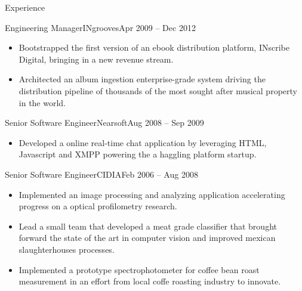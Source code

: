 \documentclass[calibri]{mcdowellcv}
\begin{document}
\begin{cvsection}{Experience}
\begin{cvsubsection}{Engineering Manager}{INgrooves}{Apr 2009 -- Dec 2012}
\begin{itemize}
    \item Bootstrapped the first version of an ebook distribution platform, INscribe Digital, bringing in a new revenue stream.
    \item Architected an album ingestion enterprise-grade system driving the distribution pipeline of thousands of the most sought after musical property in the world.
		\end{itemize}
	\end{cvsubsection}
	\begin{cvsubsection}{Senior Software Engineer}{Nearsoft}{Aug 2008 -- Sep 2009}
		\begin{itemize}%
    \item Developed a online real-time chat application by leveraging HTML, Javascript and XMPP powering the a haggling platform startup.
		\end{itemize}
	\end{cvsubsection}
	\begin{cvsubsection}{Senior Software Engineer}{CIDIA}{Feb 2006 -- Aug 2008}
		\begin{itemize}%
    \item Implemented an image processing and analyzing application accelerating progress on a optical profilometry research.
    \item Lead a small team that developed a meat grade classifier that brought forward the state of the art in computer vision and improved mexican slaughterhouses processes.
    \item Implemented a prototype spectrophotometer for coffee bean roast measurement in an effort from local coffe roasting industry to innovate.
		\end{itemize}
	\end{cvsubsection}
\end{cvsection}
\end{document}
